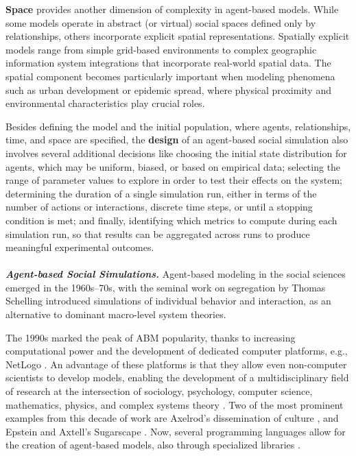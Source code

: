 \documentclass[11pt]{article}
\begin{document}
\smallskip \noindent \textbf{Space} provides another dimension of complexity in agent-based models. 
While some models operate in abstract (or virtual) social spaces defined only by relationships, others incorporate explicit spatial representations. 
Spatially explicit models range from simple grid-based environments to complex geographic information system integrations that incorporate real-world spatial data. 
The spatial component becomes particularly important when modeling phenomena such as urban development or epidemic spread, where physical proximity and environmental characteristics play crucial roles.

\smallskip \noindent
Besides defining the model and the initial population, where agents, relationships, time, and space are specified, the \textbf{design} of an agent-based social simulation also involves several additional decisions like choosing the initial state distribution for agents, which may be uniform, biased, or based on empirical data; selecting the range of parameter values to explore in order to test their effects on the system; determining the duration of a single simulation run, either in terms of the number of actions or interactions, discrete time steps, or until a stopping condition is met; and finally, identifying which metrics to compute during each simulation run, so that results can be aggregated across runs to produce meaningful experimental outcomes.
\\ \ \\
\textbf{\textit{Agent-based Social Simulations.}}
Agent-based modeling in the social sciences emerged in the 1960s–70s, with the seminal work on segregation by Thomas Schelling \cite{schelling1971dynamic} introduced simulations of individual behavior and interaction, as an alternative to dominant macro-level system theories.

The 1990s marked the peak of ABM popularity, thanks to increasing computational power and the development of dedicated computer platforms, e.g., NetLogo \cite{wilensky1999netlogo}. 
An advantage of these platforms is that they allow even non-computer scientists to develop models, enabling the development of a multidisciplinary field of research at the intersection of sociology, psychology, computer science, mathematics, physics, and complex systems theory \cite{bianchi2015agent}. 
Two of the most prominent examples from this decade of work are Axelrod’s dissemination of culture \cite{axelrod1997dissemination}, and Epstein and Axtell's Sugarscape \cite{epstein1996growing}. 
Now, several programming languages allow for the creation of agent-based models, also through specialized libraries \cite{rossetti2018ndlib, terhoeven2025mesa}. 
\end{document}
